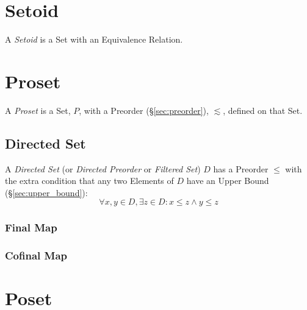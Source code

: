 \section{Setoid}\label{sec:setoid}

A \emph{Setoid} is a Set with an Equivalence Relation.



\section{Proset}\label{sec:proset}

A \emph{Proset} is a Set, $P$, with a Preorder
(\S\ref{sec:preorder}), $\lesssim$, defined on that Set.



\subsection{Directed Set}\label{sec:directed_set}

A \emph{Directed Set} (or \emph{Directed Preorder} or \emph{Filtered
  Set}) $D$ has a Preorder $\leq$ with the extra condition that any
two Elements of $D$ have an Upper Bound (\S\ref{sec:upper_bound}):
\[
  \forall x, y \in D, \exists z \in D : x \leq z \wedge y \leq z
\]



\subsubsection{Final Map}\label{sec:final_map}

\subsubsection{Cofinal Map}\label{sec:cofinal_map}



\section{Poset}\label{sec:poset}

